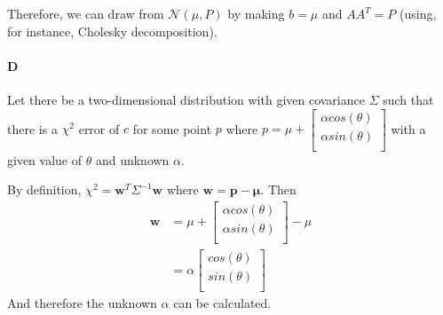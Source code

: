 \documentclass[12pt]{article}
\begin{document}
Therefore, we can draw from $\mathcal{N}\left(\mu,P\right)$ by making $b=\mu$ and $AA^T=P$ (using, for instance, Cholesky decomposition).

\paragraph{D}
Let there be a two-dimensional distribution with given covariance $\Sigma$ such that there is a $\chi^2$ error of $c$ for some point $p$ where $p = \mu +
\left[ {\begin{smallmatrix}
\alpha cos(\theta)  \\
\alpha sin(\theta)  \\
 \end{smallmatrix} } \right]$
with a given value of $\theta$ and unknown $\alpha$.

By definition, $\chi^2 = \mathbf{w}^T \Sigma^{-1} \mathbf{w}$ where $\mathbf{w} = \mathbf{p}-\mathbf{\mu}$.  Then 
\begin{align*}
\mathbf{w} &= \mu +
	\left[ {\begin{smallmatrix}
	\alpha cos(\theta)  \\
	\alpha sin(\theta)  \\
 	\end{smallmatrix} } \right] 
	- \mu \\
 &= \alpha \left[ {\begin{smallmatrix}
	cos(\theta)  \\
	sin(\theta)  \\
	 \end{smallmatrix} } \right]
\end{align*}
And therefore the unknown $\alpha$ can be calculated.
\end{document}
